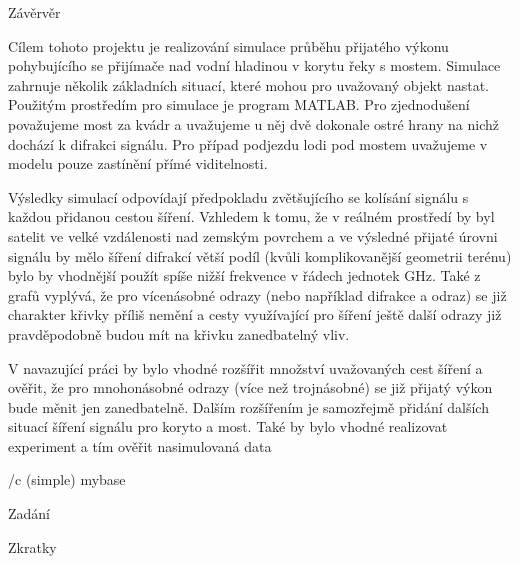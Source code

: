 \bigskip
\bigskip
\bigskip
\bigskip

 
 \chap Závěrvěr
 
Cílem tohoto projektu je realizování simulace průběhu přijatého výkonu
pohybujícího se přijímače nad vodní hladinou v korytu řeky s mostem. Simulace
zahrnuje několik základních situací, které mohou pro uvažovaný objekt nastat.
Použitým prostředím pro simulace je program MATLAB. Pro zjednodušení
považujeme most za kvádr a uvažujeme u něj dvě dokonale ostré hrany na
nichž dochází k difrakci signálu. Pro případ podjezdu lodi pod mostem
uvažujeme v modelu pouze zastínění přímé viditelnosti.


Výsledky simulací odpovídají předpokladu zvětšujícího se kolísání signálu
s každou přidanou cestou šíření. Vzhledem k tomu, že v reálném prostředí by
byl satelit ve velké vzdálenosti nad zemským povrchem a ve výsledné přijaté
úrovni signálu by mělo šíření difrakcí větší podíl (kvůli komplikovanější geometrii
terénu) bylo by vhodnější použít spíše nižší frekvence v řádech jednotek GHz.
Také z grafů vyplývá, že pro vícenásobné odrazy (nebo například difrakce a
odraz) se již charakter křivky příliš nemění a cesty využívající pro šíření ještě
další odrazy již pravděpodobně budou mít na křivku zanedbatelný vliv.


V navazující práci by bylo vhodné rozšířit množství uvažovaných cest
šíření a ověřit, že pro mnohonásobné odrazy (více než trojnásobné) se již přijatý
výkon bude měnit jen zanedbatelně. Dalším rozšířením je samozřejmě přidání
dalších situací šíření signálu pro koryto a most. Také by bylo vhodné realizovat
experiment a tím ověřit nasimulovaná data
 



 \bibchap
 \usebib/c (simple) mybase

\app Zadání

 

\app Zkratky\par \makeglos %



 
 
 \bye
  
 